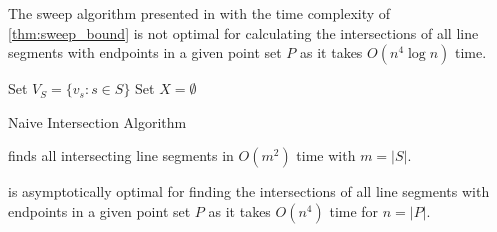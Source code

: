 
\begin{theorem}
  The sweep algorithm presented in \cite[Section 2.1]{deberg_compgeom}
  with the time complexity of \cref{thm:sweep_bound} is not optimal
  for calculating the intersections of all line segments with
  endpoints in a given point set \(P\) as it takes \(O(n^4 \log n)\)
  time.
\end{theorem}


\begin{algorithm}
  \DontPrintSemicolon
  
  
  Set \(V_S = \{v_s : s \in S\} \) \;
  Set \(X = \emptyset\) \;
  \caption{\label{alg:naive_intersection}Naive Intersection Algorithm}
\end{algorithm}


\begin{theorem}
   finds all intersecting line segments
  in \(O(m^2)\) time with \(m = |S|\).  
\end{theorem}


\begin{theorem}
   is asymptotically optimal for finding
  the intersections of all line segments with endpoints in a given
  point set \(P\) as it takes \(O(n^4)\) time for \(n = |P|\).
\end{theorem}


